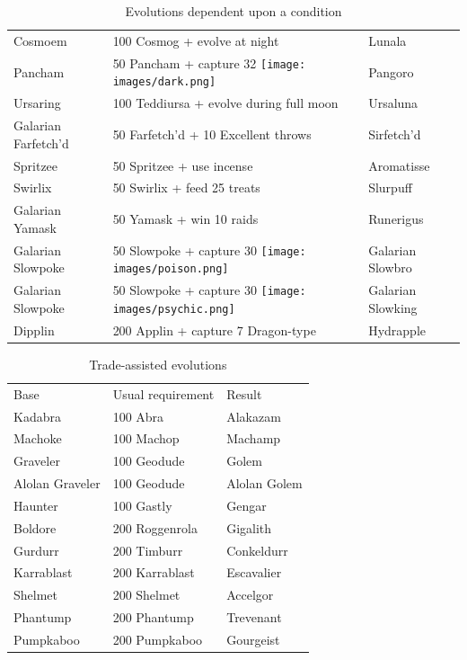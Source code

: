 \begin{table}
\begin{tabular}{lll}
  Cosmoem & 100 Cosmog + evolve at night & Lunala\\
  Pancham	& 50 Pancham + capture 32 \texttt{[image: images/dark.png]} & Pangoro\\
  Ursaring & 100 Teddiursa + evolve during full moon & Ursaluna\\
  Galarian Farfetch'd & 50 Farfetch'd + 10 Excellent throws & Sirfetch'd \\
  Spritzee & 50 Spritzee + use incense & Aromatisse\\
  Swirlix & 50 Swirlix + feed 25 treats & Slurpuff\\
  Galarian Yamask & 50 Yamask + win 10 raids & Runerigus\\
  Galarian Slowpoke & 50 Slowpoke + capture 30 \texttt{[image: images/poison.png]} & Galarian Slowbro\\
  Galarian Slowpoke & 50 Slowpoke + capture 30 \texttt{[image: images/psychic.png]} & Galarian Slowking\\
  Dipplin & 200 Applin + capture 7 Dragon-type & Hydrapple \\
\end{tabular}
\caption{Evolutions dependent upon a condition\label{table:condevolutions}}
\end{table}
\begin{table}
\footnotesize
\centering
\begin{tabular}{lll}
  Base & Usual requirement & Result \\
\Midrule
Kadabra & 100 Abra & Alakazam\\
Machoke & 100 Machop & Machamp\\
  Graveler & 100 Geodude & Golem\\
  Alolan Graveler & 100 Geodude & Alolan Golem\\
  Haunter & 100 Gastly & Gengar\\
  Boldore & 200 Roggenrola & Gigalith\\
  Gurdurr & 200 Timburr & Conkeldurr\\
  Karrablast & 200 Karrablast & Escavalier\\
  Shelmet & 200 Shelmet & Accelgor\\
  Phantump & 200 Phantump & Trevenant\\
  Pumpkaboo & 200 Pumpkaboo & Gourgeist\\
\end{tabular}
  \caption{Trade-assisted evolutions\label{table:tradeevolution}}
\end{table}
